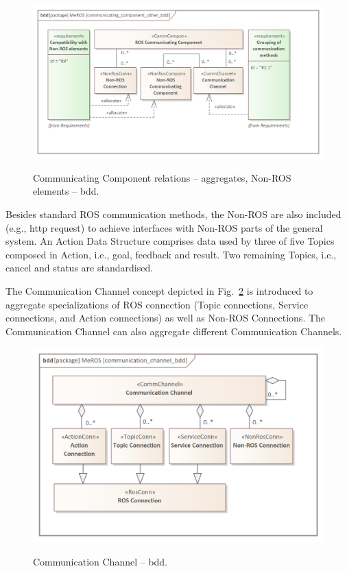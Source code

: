 \documentclass[11pt,oneside,a4paper]{article}
\begin{document}
	\begin{figure}[H]
		\centering
		\begin{center}
			{\includegraphics[scale=1.0]{img/meros_pkg/communicating_component_other_bdd.png}}
		\end{center}
		\caption{Communicating Component relations -- aggregates, Non-ROS elements -- bdd.} 
		\label{fig:communicating_component_other_bdd}
	\end{figure}
	
	Besides standard ROS communication methods, the Non-ROS are also included (e.g., http request) to achieve interfaces with Non-ROS parts of the general system. An Action Data Structure comprises data used by three of five Topics composed in Action, i.e., goal, feedback and result. Two remaining Topics, i.e., cancel and status are standardised.
	
	\pagebreak
	
	 The Communication Channel \cite{palka2022communication} concept depicted in Fig.~\ref{fig:communication_channel_bdd} is introduced to aggregate specializations of ROS connection (Topic connections, Service connections, and Action connections) as well as Non-ROS Connections. The Communication Channel can also aggregate different Communication Channels.
	 
  
 	\begin{figure}[H]
	 	\centering
	 	\begin{center}
	 		{\includegraphics[scale=1.0]{img/meros_pkg/communication_channel_bdd.png}}
	 	\end{center}
	 	\caption{Communication Channel -- bdd.} 
	 	\label{fig:communication_channel_bdd}
	 \end{figure}
	 
\end{document}
